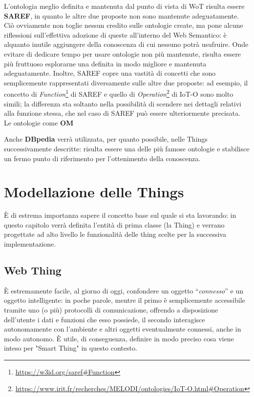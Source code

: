 \documentclass[12pt,a4paper,openright,oneside]{report}
\newcommand{\quotes}[1]{``#1''}
\begin{document}
L'ontologia meglio definita e mantenuta dal punto di vista di WoT risulta essere \textbf{SAREF}, in quanto le altre due proposte non sono mantenute adeguatamente. Ciò ovviamente non toglie nessun credito sulle ontologie create, ma pone alcune riflessioni sull'effettiva adozione di queste all'interno del Web Semantico: è alquanto inutile aggiungere della conoscenza di cui nessuno potrà usufruire. Onde evitare di dedicare tempo per usare ontologie non più mantenute, risulta essere più fruttuoso esplorarne una definita in modo migliore e mantenuta adeguatamente. Inoltre, SAREF copre una vastità di concetti che sono semplicemente rappresentati diversamente sulle altre due proposte: ad esempio, il concetto di \textit{Function}\footnote{\url{https://w3id.org/saref\#Function}} di SAREF e quello di \textit{Operation}\footnote{\url{https://www.irit.fr/recherches/MELODI/ontologies/IoT-O.html\#Operation}} di IoT-O sono molto simili; la differenza sta soltanto nella possibilità di scendere nei dettagli relativi alla funzione stessa, che nel caso di SAREF può essere ulteriormente precisata.\\

Le ontologie come \textbf{OM} 

Anche \textbf{DBpedia} verrà utilizzata, per quanto possibile, nelle Things successivamente descritte: risulta essere una delle più famose ontologie e stabilisce un fermo punto di riferimento per l'ottenimento della conoscenza.





\clearpage{\pagestyle{empty}\cleardoublepage}
\chapter{Modellazione delle Things}           %
\lhead[\fancyplain{}{\bfseries\thepage}]{\fancyplain{}{\bfseries\rightmark}}  

È di estrema importanza sapere il concetto base sul quale si sta lavorando: in questo capitolo verrà definita l'entità di prima classe (la Thing) e verrano progettate ad alto livello le funzionalità delle thing scelte per la successiva implementazione.


\section{Web Thing}
\label{sec:webthing}
È estremamente facile, al giorno di oggi, confondere un oggetto \quotes{\textit{connesso}} e un oggetto intelligente: in poche parole, mentre il primo è semplicemente accessibile tramite uno (o più) protocolli di comunicazione, offrendo a disposizione dell'utente i dati e funzioni che esso possiede, il secondo interagisce autonomamente con l'ambiente e altri oggetti eventualmente connessi, anche in modo autonomo. È utile, di conseguenza, definire in modo preciso cosa viene inteso per "Smart Thing" in questo contesto.\\
\end{document}
